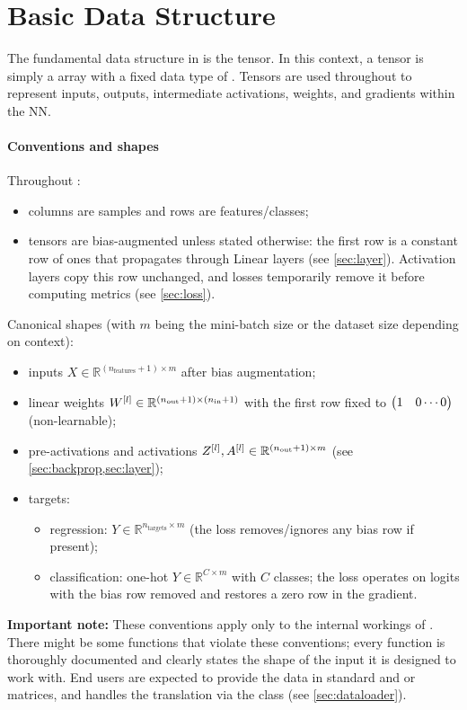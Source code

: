 \section{Basic Data Structure} \label{sec:tensor}

The fundamental data structure in \mfnet is the tensor. In this context, a tensor is simply a  array with a fixed data type of . Tensors are used throughout \mfnet to represent inputs, outputs, intermediate activations, weights, and gradients within the \acl{NN}.

\paragraph{Conventions and shapes} Throughout \mfnet:
\begin{itemize}
    \item columns are samples and rows are features/classes;
    \item tensors are bias-augmented unless stated otherwise: the first row is a constant row of ones that propagates through Linear layers (see \cref{sec:layer}). Activation layers copy this row unchanged, and losses temporarily remove it before computing metrics (see \cref{sec:loss}).
\end{itemize}

Canonical shapes (with $m$ being the mini-batch size or the dataset size depending on context):
\begin{itemize}
    \item inputs $X \in \mathbb{R}^{(n_\text{features}+1)\times m}$ after bias augmentation;
    \item linear weights $W^{[l]} \in \mathbb{R}^{(n_\text{out}+1)\times(n_\text{in}+1)}$ with the first row fixed to $\mqty(1 & 0 \cdots 0)$ (non-learnable);
    \item pre-activations and activations $Z^{[l]}, A^{[l]} \in \mathbb{R}^{(n_\text{out}+1)\times m}$ (see \cref{sec:backprop,sec:layer});
    \item targets:
    \begin{itemize}
        \item regression: $Y \in \mathbb{R}^{n_\text{targets}\times m}$ (the loss removes/ignores any bias row if present);
        \item classification: one-hot $Y \in \mathbb{R}^{C\times m}$ with $C$ classes; the loss operates on logits with the bias row removed and restores a zero row in the gradient.
    \end{itemize}
\end{itemize}

\textbf{Important note:} These conventions apply only to the internal workings of \mfnet. There might be some functions that violate these conventions; every function is thoroughly documented and clearly states the shape of the input it is designed to work with. End users are expected to provide the data in standard  and  or  matrices, and \mfnet handles the translation via the  class (see \cref{sec:dataloader}).
